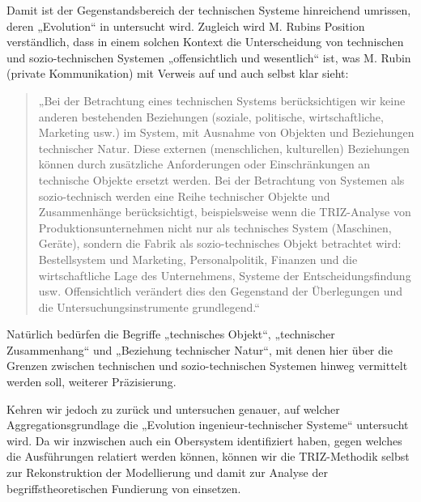 \documentclass[11pt,a4paper]{article}
\begin{document}
Damit ist der Gegenstandsbereich der technischen Systeme hinreichend umrissen,
deren „Evolution“ in \cite{TESE2018} untersucht wird. Zugleich wird M. Rubins
Position verständlich, dass in einem solchen Kontext die Unterscheidung von
technischen und sozio-technischen Systemen „offensichtlich und wesentlich“
ist, was M. Rubin (private Kommunikation) mit Verweis auf \cite{Rubin2007} und
\cite{Rubin2010} auch selbst klar sieht:
\begin{quote}
  „Bei der Betrachtung eines technischen Systems berücksichtigen wir keine
  anderen bestehenden Beziehungen (soziale, politische, wirtschaftliche,
  Marketing usw.) im System, mit Ausnahme von Objekten und Beziehungen
  technischer Natur. Diese externen (menschlichen, kulturellen) Beziehungen
  können durch zusätzliche Anforderungen oder Einschränkungen an technische
  Objekte ersetzt werden.  Bei der Betrachtung von Systemen als
  sozio-technisch werden eine Reihe technischer Objekte und Zusammenhänge
  berücksichtigt, beispielsweise wenn die TRIZ-Analyse von
  Produktionsunternehmen nicht nur als technisches System (Maschinen, Geräte),
  sondern die Fabrik als sozio-technisches Objekt betrachtet wird:
  Bestellsystem und Marketing, Personalpolitik, Finanzen und die
  wirtschaftliche Lage des Unternehmens, Systeme der Entscheidungsfindung usw.
  Offensichtlich verändert dies den Gegenstand der Überlegungen und die
  Untersuchungsinstrumente grundlegend.“
\end{quote}
Natürlich bedürfen die Begriffe „technisches Objekt“, „technischer
Zusammenhang“ und „Beziehung technischer Natur“, mit denen hier über die
Grenzen zwischen technischen und sozio-technischen Systemen hinweg vermittelt
werden soll, weiterer Präzisierung.

Kehren wir jedoch zu \cite{TESE2018} zurück und untersuchen genauer, auf
welcher Aggregationsgrundlage die „Evolution ingenieur-technischer Systeme“
untersucht wird.  Da wir inzwischen auch ein Obersystem identifiziert haben,
gegen welches die Ausführungen relatiert werden können, können wir die
TRIZ-Methodik selbst zur Rekonstruktion der Modellierung und damit zur Analyse
der begriffstheoretischen Fundierung von \cite{TESE2018} einsetzen.
\end{document}
